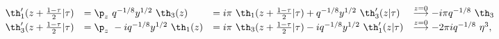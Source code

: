 \begin{equation}
  \begin{array}{llll}
    \th_1'(z+{1-\tau\over 2} | \tau) &= \p_z ~q^{-1/8} y^{1/2}
    ~\th_3(z) &= i\pi ~\th_1(z+{1-\tau\over 2}|\tau) + q^{-1/8} y^{1/2}
    ~\th_3'(z|\tau)   &\stackrel{z=0}{\longrightarrow} -i
    \pi q^{-1/8} ~\th_3 \\
    \th_3'(z+{1-\tau\over 2} | \tau) &= \p_z ~-i q^{-1/8} y^{1/2}
    ~\th_1(z) &= i\pi ~\th_3(z+{1-\tau\over 2}|\tau) -i q^{-1/8} y^{1/2}
    ~\th_1'(z|\tau) &\stackrel{z=0}{\longrightarrow} -
    2\pi i q^{-1/8} ~\eta^3, 
  \end{array}
\end{equation}

